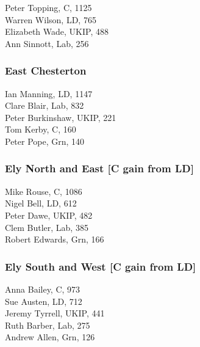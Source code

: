 \documentclass[a4paper,openany,10pt]{book}
\begin{document}


Peter Topping, C, 1125\\
Warren Wilson, LD, 765\\
Elizabeth Wade, UKIP, 488\\
Ann Sinnott, Lab, 256\\


\subsubsection*{East Chesterton}



Ian Manning, LD, 1147\\
Clare Blair, Lab, 832\\
Peter Burkinshaw, UKIP, 221\\
Tom Kerby, C, 160\\
Peter Pope, Grn, 140\\


\subsubsection*{Ely North and East \hspace*{\fill}\nolinebreak[1]%
\enspace\hspace*{\fill}
[C gain from LD]}



Mike Rouse, C, 1086\\
Nigel Bell, LD, 612\\
Peter Dawe, UKIP, 482\\
Clem Butler, Lab, 385\\
Robert Edwards, Grn, 166\\


\subsubsection*{Ely South and West \hspace*{\fill}\nolinebreak[1]%
\enspace\hspace*{\fill}
[C gain from LD]}



Anna Bailey, C, 973\\
Sue Austen, LD, 712\\
Jeremy Tyrrell, UKIP, 441\\
Ruth Barber, Lab, 275\\
Andrew Allen, Grn, 126\\
\end{document}
